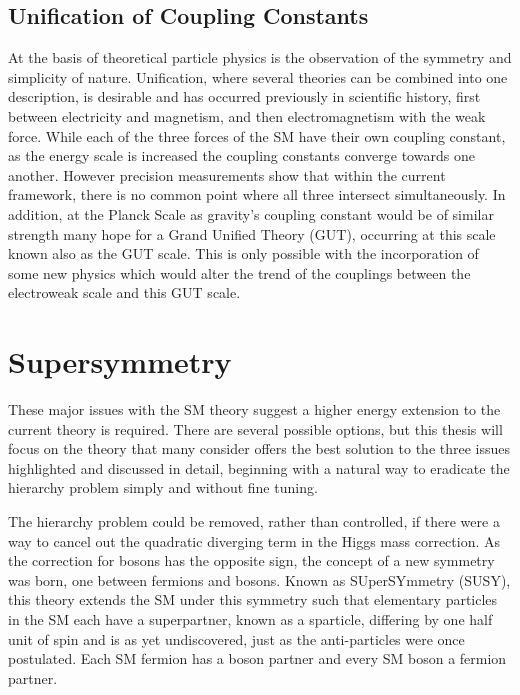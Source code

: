 \subsection{Unification of Coupling Constants}

At the basis of theoretical particle physics is the observation of the symmetry and simplicity of nature. Unification, where several theories can be combined into one description, is desirable and has occurred previously in scientific history, first between electricity and magnetism, and then electromagnetism with the weak force. While each of the three forces of the SM have their own coupling constant, as the energy scale is increased the coupling constants converge towards one another. However precision measurements show that within the current framework,  there is no common point where all three intersect simultaneously. In addition, at the Planck Scale as gravity's coupling constant would be of similar strength many hope for a Grand Unified Theory (GUT),  occurring at this scale known also as the GUT scale. This is only possible with the incorporation of some new physics which would alter the trend of the couplings between the electroweak scale and this GUT scale. 



\section{Supersymmetry}

These major issues with the SM theory suggest a higher energy extension to the current theory is required. There are several possible options, but this thesis will focus on the theory that many consider offers the best solution to the three issues highlighted and discussed in detail, beginning with a natural way to eradicate the hierarchy problem simply and without fine tuning.

The hierarchy problem could be removed, rather than controlled, if there were a way to cancel out the quadratic diverging term in the Higgs mass correction. As the correction for bosons has the opposite sign, the concept of a new symmetry was born, one between fermions and bosons. Known as SUperSYmmetry (SUSY), this theory extends the SM under this symmetry such that elementary particles in the SM each have a superpartner, known as a sparticle, differing by one half unit of spin and is as yet undiscovered, just as the anti-particles were once postulated. Each SM fermion has a boson partner and every SM boson a fermion partner. 

